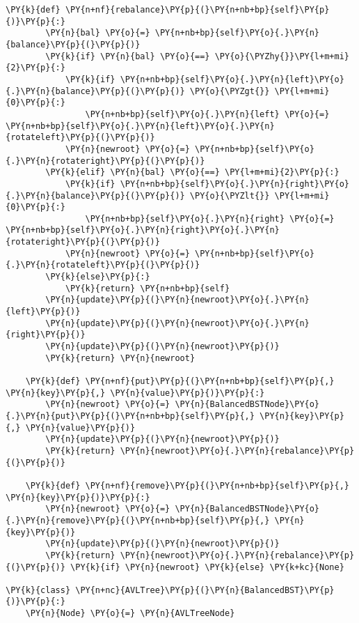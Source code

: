 \begin{Verbatim}[commandchars=\\\{\}]
    \PY{k}{def} \PY{n+nf}{rebalance}\PY{p}{(}\PY{n+nb+bp}{self}\PY{p}{)}\PY{p}{:}
        \PY{n}{bal} \PY{o}{=} \PY{n+nb+bp}{self}\PY{o}{.}\PY{n}{balance}\PY{p}{(}\PY{p}{)}
        \PY{k}{if} \PY{n}{bal} \PY{o}{==} \PY{o}{\PYZhy{}}\PY{l+m+mi}{2}\PY{p}{:}
            \PY{k}{if} \PY{n+nb+bp}{self}\PY{o}{.}\PY{n}{left}\PY{o}{.}\PY{n}{balance}\PY{p}{(}\PY{p}{)} \PY{o}{\PYZgt{}} \PY{l+m+mi}{0}\PY{p}{:}
                \PY{n+nb+bp}{self}\PY{o}{.}\PY{n}{left} \PY{o}{=} \PY{n+nb+bp}{self}\PY{o}{.}\PY{n}{left}\PY{o}{.}\PY{n}{rotateleft}\PY{p}{(}\PY{p}{)}
            \PY{n}{newroot} \PY{o}{=} \PY{n+nb+bp}{self}\PY{o}{.}\PY{n}{rotateright}\PY{p}{(}\PY{p}{)}
        \PY{k}{elif} \PY{n}{bal} \PY{o}{==} \PY{l+m+mi}{2}\PY{p}{:}
            \PY{k}{if} \PY{n+nb+bp}{self}\PY{o}{.}\PY{n}{right}\PY{o}{.}\PY{n}{balance}\PY{p}{(}\PY{p}{)} \PY{o}{\PYZlt{}} \PY{l+m+mi}{0}\PY{p}{:}
                \PY{n+nb+bp}{self}\PY{o}{.}\PY{n}{right} \PY{o}{=} \PY{n+nb+bp}{self}\PY{o}{.}\PY{n}{right}\PY{o}{.}\PY{n}{rotateright}\PY{p}{(}\PY{p}{)}
            \PY{n}{newroot} \PY{o}{=} \PY{n+nb+bp}{self}\PY{o}{.}\PY{n}{rotateleft}\PY{p}{(}\PY{p}{)}
        \PY{k}{else}\PY{p}{:}
            \PY{k}{return} \PY{n+nb+bp}{self}
        \PY{n}{update}\PY{p}{(}\PY{n}{newroot}\PY{o}{.}\PY{n}{left}\PY{p}{)}
        \PY{n}{update}\PY{p}{(}\PY{n}{newroot}\PY{o}{.}\PY{n}{right}\PY{p}{)}
        \PY{n}{update}\PY{p}{(}\PY{n}{newroot}\PY{p}{)}
        \PY{k}{return} \PY{n}{newroot}

    \PY{k}{def} \PY{n+nf}{put}\PY{p}{(}\PY{n+nb+bp}{self}\PY{p}{,} \PY{n}{key}\PY{p}{,} \PY{n}{value}\PY{p}{)}\PY{p}{:}
        \PY{n}{newroot} \PY{o}{=} \PY{n}{BalancedBSTNode}\PY{o}{.}\PY{n}{put}\PY{p}{(}\PY{n+nb+bp}{self}\PY{p}{,} \PY{n}{key}\PY{p}{,} \PY{n}{value}\PY{p}{)}
        \PY{n}{update}\PY{p}{(}\PY{n}{newroot}\PY{p}{)}
        \PY{k}{return} \PY{n}{newroot}\PY{o}{.}\PY{n}{rebalance}\PY{p}{(}\PY{p}{)}

    \PY{k}{def} \PY{n+nf}{remove}\PY{p}{(}\PY{n+nb+bp}{self}\PY{p}{,} \PY{n}{key}\PY{p}{)}\PY{p}{:}
        \PY{n}{newroot} \PY{o}{=} \PY{n}{BalancedBSTNode}\PY{o}{.}\PY{n}{remove}\PY{p}{(}\PY{n+nb+bp}{self}\PY{p}{,} \PY{n}{key}\PY{p}{)}
        \PY{n}{update}\PY{p}{(}\PY{n}{newroot}\PY{p}{)}
        \PY{k}{return} \PY{n}{newroot}\PY{o}{.}\PY{n}{rebalance}\PY{p}{(}\PY{p}{)} \PY{k}{if} \PY{n}{newroot} \PY{k}{else} \PY{k+kc}{None}

\PY{k}{class} \PY{n+nc}{AVLTree}\PY{p}{(}\PY{n}{BalancedBST}\PY{p}{)}\PY{p}{:}
    \PY{n}{Node} \PY{o}{=} \PY{n}{AVLTreeNode}
\end{Verbatim}


